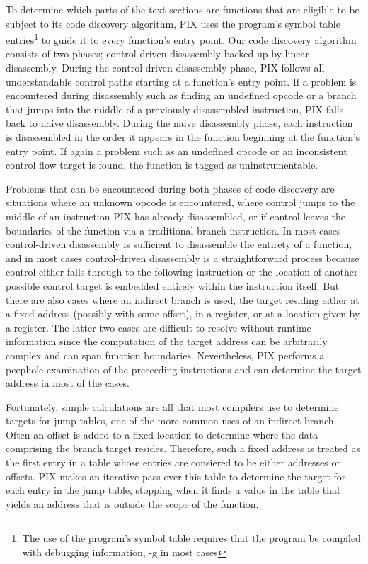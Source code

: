 To determine which parts of the text sections are functions that are eligible to be subject to its code discovery algorithm, 
PIX uses the program's symbol table entries\footnote{The use of the program's symbol table requires that the program be compiled
with debugging information, -g in most cases} to guide it to every function's entry point. Our code discovery algorithm
consists of two phases; control-driven disassembly backed up by linear disassembly. During the control-driven disassembly phase, 
PIX follows all understandable control paths starting at a function's entry point. If a problem is encountered during disassembly such as 
finding an undefined opcode or a branch that jumps into the middle of a previously disassembled instruction, 
PIX falls back to naive disassembly. During the naive disassembly phase, each instruction is disassembled in the order it appears in the
function beginning at the function's entry point. If again a problem such as an undefined opcode or an inconsistent control flow target 
is found, the function is tagged as uninstrumentable.

Problems that can be encountered during both phases of code discovery
are situations where an unknown opcode is encountered, where control jumps to the
middle of an instruction PIX has already disassembled, or if control leaves the boundaries of the function via a traditional branch
instruction. In most
cases control-driven disassembly is sufficient to disassemble the entirety of a function, and in most cases control-driven
disassembly is a straightforward process because control either falls through to the following instruction 
or the location of another possible control target is embedded entirely within the instruction itself. But there are also cases
where an indirect branch is used, the target residing either at a fixed address (possibly with some offset), in a register, 
or at a location given by a register. The latter two cases are difficult to resolve
without runtime information since the computation of the target address can be arbitrarily complex and can span function
boundaries. Nevertheless, PIX performs a peephole examination of the preceeding instructions and can determine 
the target address in most of the cases.

Fortunately, simple calculations are all that most compilers use to determine targets for jump tables, one of the more common
uses of an indirect branch. Often an offset is added to a fixed location to determine where the data comprising the branch target
resides. Therefore, such a fixed address is treated as the first entry in a table whose entries are consiered to be either addresses or offsets.
PIX makes an iterative pass over this table to determine the target for each entry in the jump table, stopping when it finds a value in the
table that yields an address that is outside the scope of the function.

